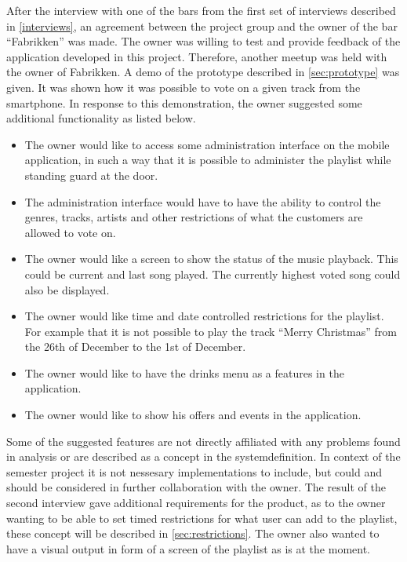 \label{sec:fabrikken}
After the interview with one of the bars from the first set of interviews described in \cref{interviews}, an agreement between the project group and the owner of the bar \enquote{Fabrikken} was made. The owner was willing to test and provide feedback of the application developed in this project. Therefore, another meetup was held with the owner of Fabrikken. A demo of the prototype described in \cref{sec:prototype} was given. It was shown how it was possible to vote on a given track from the smartphone. In response to this demonstration, the owner suggested some additional functionality as listed below.

\begin{itemize}
    \item{The owner would like to access some administration interface on the mobile application, in such a way that it is possible to administer the playlist while standing guard at the door.}
    \item{The administration interface would have to have the ability to control the genres, tracks, artists and other restrictions of what the customers are allowed to vote on.}
    \item{The owner would like a screen to show the status of the music playback. This could be current and last song played. The currently highest voted song could also be displayed.}
    \item{The owner would like time and date controlled restrictions for the playlist. For example that it is not possible to play the track \enquote{Merry Christmas} from the 26th of December to the 1st of December.}
    \item{The owner would like to have the drinks menu as a features in the application.}
    \item{The owner would like to show his offers and events in the application.}
\end{itemize}

Some of the suggested features are not directly affiliated with any problems found in analysis or are described as a concept in the systemdefinition. In context of the semester project it is not nessesary implementations to include, but could and should be considered in further collaboration with the owner. The result of the second interview gave additional requirements for the product, as to the owner wanting to be able to set timed restrictions for what user can add to the playlist, these concept will be described in \cref{sec:restrictions}. The owner also wanted to have a visual output in form of a screen of the playlist as is at the moment.
